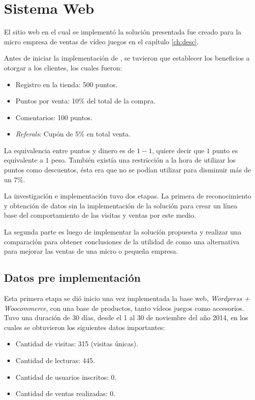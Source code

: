 \section{Sistema Web}
\label{cap_estudio}

El sitio web en el cual se implementó la solución presentada fue creado para la micro empresa de
ventas de vídeo juegos en el capítulo \ref{ch:desc}.

Antes de iniciar la implementación de {\gam}, se tuvieron que establecer los beneficios a otorgar a los 
clientes, los cuales fueron:

\begin{itemize}

\item Registro en la tienda: 500 puntos.
\item Puntos por venta: 10\% del total de la compra.
\item Comentarios: 100 puntos.
\item \emph{Referals}: Cupón de 5\% en total venta.

\end{itemize}

La equivalencia entre puntos y dinero es de $1-1$, quiere decir que $1$ punto es equivalente a 
$1$ peso. También existía una restricción a la hora de utilizar los puntos como descuentos, ésta 
era que no se podían utilizar para disminuir más de un 7\%.

La investigación e implementación tuvo dos etapas. La primera de reconocimiento y obtención de datos
 sin la implementación de la solución para crear un línea base del comportamiento de las visitas 
y ventas por este medio.

La segunda parte es luego de implementar la solución
propuesta y realizar una comparación para obtener conclusiones de la utilidad de
{\gam} como una alternativa para mejorar las ventas de una micro o pequeña empresa.

\subsection{Datos pre implementación {\gam}}

Esta primera etapa se dió inicio una vez implementada la base web,
\emph{Wordpress + Woocommerce}, con una base de productos, tanto vídeos juegos como
accesorios.
Tuvo una duración de 30 días, desde el 1 al 30 de noviembre del año 2014,
en los cuales se obtuvieron los siguientes datos importantes:


\begin{itemize}
    \item Cantidad de visitas: 315 (visitas únicas).
    \item Cantidad de lecturas: 445.
    \item Cantidad de usuarios inscritos: 0.
    \item Cantidad de ventas realizadas: 0.
\end{itemize}

